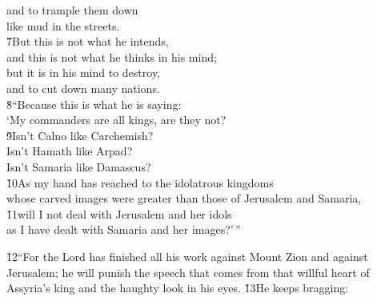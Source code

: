 \begin{poetry}
\poemll    and to trample them down \\
\poemlll       like mud in the streets. \\
\poeml \v{7}But this is not what he intends, \\
\poemll    and this is not what he thinks in his mind; \\
\poeml but it is in his mind to destroy, \\
\poemll    and to cut down many nations. \\
\poeml \v{8}``Because this is what he is saying: \\
\poemll    `My commanders are all kings, are they not? \\
\poeml \v{9}Isn't Calno like Carchemish? \\
\poemll    Isn't Hamath like Arpad? \\
\poemlll       Isn't Samaria like Damascus? \\
\poeml \v{10}As my hand has reached to the idolatrous kingdoms \\
\poemll    whose carved images were greater than those of Jerusalem and Samaria, \\
\poeml \v{11}will I not deal with Jerusalem and her idols \\
\poemll    as I have dealt with Samaria and her images?'\,''
\end{poetry}

\v{12}``For the Lord has finished all his work against Mount Zion and against Jerusalem; he will punish the speech that comes from that willful heart of Assyria's king and the haughty look in his eyes. \v{13}He keeps bragging:

